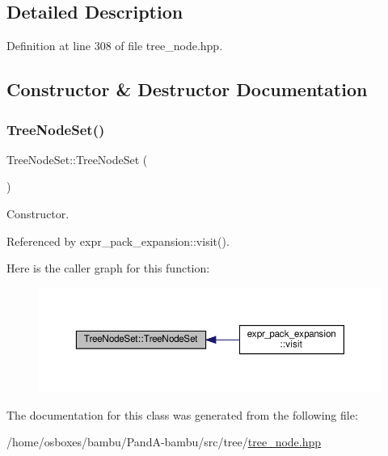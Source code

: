 \subsection{Detailed Description}


Definition at line 308 of file tree\+\_\+node.\+hpp.



\subsection{Constructor \& Destructor Documentation}
\mbox{\label{classTreeNodeSet_ab97042a960b789fcf1cae69e00a7a57c}} 
\subsubsection{\texorpdfstring{Tree\+Node\+Set()}{TreeNodeSet()}}
{\footnotesize\ttfamily Tree\+Node\+Set\+::\+Tree\+Node\+Set (\begin{DoxyParamCaption}{ }\end{DoxyParamCaption})}



Constructor. 



Referenced by expr\+\_\+pack\+\_\+expansion\+::visit().

Here is the caller graph for this function\+:
\nopagebreak
\begin{figure}[H]
\begin{center}
\leavevmode
\includegraphics[width=350pt]{db/d18/classTreeNodeSet_ab97042a960b789fcf1cae69e00a7a57c_icgraph}
\end{center}
\end{figure}


The documentation for this class was generated from the following file\+:\begin{DoxyCompactItemize}
\item 
/home/osboxes/bambu/\+Pand\+A-\/bambu/src/tree/\hyperlink{tree__node_8hpp}{tree\+\_\+node.\+hpp}\end{DoxyCompactItemize}
